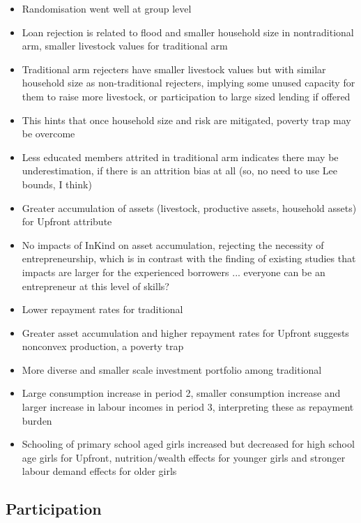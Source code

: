 \begin{itemize}
\vspace{1.0ex}\setlength{\itemsep}{1.0ex}\setlength{\baselineskip}{12pt}
\item	Randomisation went well at group level
\item	Loan rejection is related to flood and smaller household size in nontraditional arm, smaller livestock values for traditional arm
\item	Traditional arm rejecters have smaller livestock values but with similar household size as non-traditional rejecters, implying some unused capacity for them to raise more livestock, or participation to large sized lending if offered
\item	This hints that once household size and risk are mitigated, poverty trap may be overcome
\item	Less educated members attrited in traditional arm indicates there may be underestimation, if there is an attrition bias at all (so, no need to use Lee bounds, I think)
\item	Greater accumulation of assets (livestock, productive assets, household assets) for \textsf{Upfront} attribute
\item	No impacts of \textsf{InKind} on asset accumulation, rejecting the necessity of entrepreneurship, which is in contrast with the finding of existing studies that impacts are larger for the experienced borrowers ... everyone can be an entrepreneur at this level of skills? 
\item	Lower repayment rates for \textsf{traditional}
\item	Greater asset accumulation and higher repayment rates for \textsf{Upfront} suggests nonconvex production, a poverty trap
\item	More diverse and smaller scale investment portfolio among \textsf{traditional}
\item	Large consumption increase in period 2, smaller consumption increase and larger increase in labour incomes in period 3, interpreting these as repayment burden
\item	Schooling of primary school aged girls increased but decreased for high school age girls for \textsf{Upfront}, nutrition/wealth effects for younger girls and stronger labour demand effects for older girls 
\end{itemize}



\subsection{Participation}

